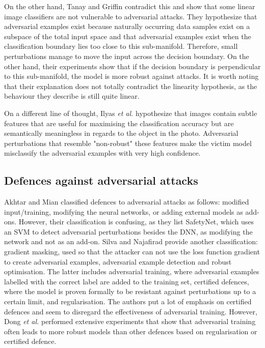 On the other hand, Tanay and Griffin \cite{tanay2016boundary} contradict this and show that some linear image classifiers are not vulnerable to adversarial attacks. They hypothesize that adversarial examples exist because naturally occurring data samples exist on a subspace of the total input space and that adversarial examples exist when the classification boundary lies too close to this sub-manifold. Therefore, small perturbations manage to move the input across the decision boundary. On the other hand, their experiments show that if the decision boundary is perpendicular to this sub-manifold, the model is more robust against attacks. It is worth noting that their explanation does not totally contradict the linearity hypothesis, as the behaviour they describe is still quite linear.

On a different line of thought, Ilyas \textit{et al.} \cite{adv_examples_bugs} hypothesize that images contain subtle features that are useful for maximising the classification accuracy but are semantically meaningless in regards to the object in the photo. Adversarial perturbations that resemble "non-robust" these features make the victim model misclassify the adversarial examples with very high confidence.

\subsection{Defences against adversarial attacks}

Akhtar and Mian \cite{akhtar} classified defences to adversarial attacks as follows: modified input/training, modifying the neural networks, or adding external models as add-ons. However, their classification is confusing, as they list SafetyNet, which uses an SVM to detect adversarial perturbations besides the DNN, as modifying the network and not as an add-on. Silva and Najafirad \cite{silva_survey} provide another classification: gradient masking, used so that the attacker can not use the loss function gradient to create adversarial examples, adversarial example detection and robust optimisation. The latter includes adversarial training, where adversarial examples labelled with the correct label are added to the training set, certified defences, where the model is proven formally to be resistant against perturbations up to a certain limit, and regularisation. The authors put a lot of emphasis on certified defences and seem to disregard the effectiveness of adversarial training. However, Dong \textit{et al.} \cite{dong2020benchmarking} performed extensive experiments that show that adversarial training often leads to more robust models than other defences based on regularisation or certified defence.

